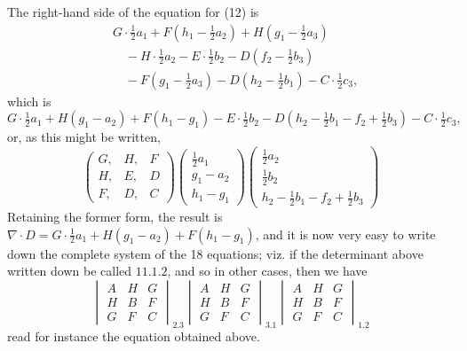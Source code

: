 \documentclass[11pt,a4paper]{book}
\begin{document}
The right-hand side of the equation for (12) is
\[
\begin{aligned}
& G \cdot \tfrac{1}{2}a_1 + F(h_1 - \tfrac{1}{2}a_2) + H(g_1 - \tfrac{1}{2}a_3) \\
&\quad - H \cdot \tfrac{1}{2}a_2 - E \cdot \tfrac{1}{2}b_2 - D(f_2 - \tfrac{1}{2}b_3) \\
&\quad - F(g_1 - \tfrac{1}{2}a_3) - D(h_2 - \tfrac{1}{2}b_1) - C \cdot \tfrac{1}{2}c_3,
\end{aligned}
\]
which is
\[
G \cdot \tfrac{1}{2}a_1 + H(g_1 - a_2) + F(h_1 - g_1) - E \cdot \tfrac{1}{2}b_2 - D(h_2 - \tfrac{1}{2}b_1 - f_2 + \tfrac{1}{2}b_3) - C \cdot \tfrac{1}{2}c_3,
\]
or, as this might be written,
\[
\begin{pmatrix}
G, & H, & F \\
H, & E, & D \\
F, & D, & C
\end{pmatrix}
\begin{pmatrix}
\tfrac{1}{2}a_1 \\ g_1 - a_2 \\ h_1 - g_1
\end{pmatrix}
\begin{pmatrix}
\tfrac{1}{2}a_2 \\ \tfrac{1}{2}b_2 \\ h_2 - \tfrac{1}{2}b_1 - f_2 + \tfrac{1}{2}b_3
\end{pmatrix}
\]
Retaining the former form, the result is $\nabla \cdot D = G \cdot \tfrac{1}{2}a_1 + H(g_1 - a_2) + F(h_1 - g_1)$, and it is now very easy to write down the complete system of the 18 equations; viz. if the determinant above written down be called $11.1.2$, and so in other cases, then we have
\[
\begin{vmatrix}
A & H & G \\
H & B & F \\
G & F & C
\end{vmatrix}_{2.3}
\begin{vmatrix}
A & H & G \\
H & B & F \\
G & F & C
\end{vmatrix}_{3.1}
\begin{vmatrix}
A & H & G \\
H & B & F \\
G & F & C
\end{vmatrix}_{1.2}
\]
read for instance the equation obtained above.
\end{document}
